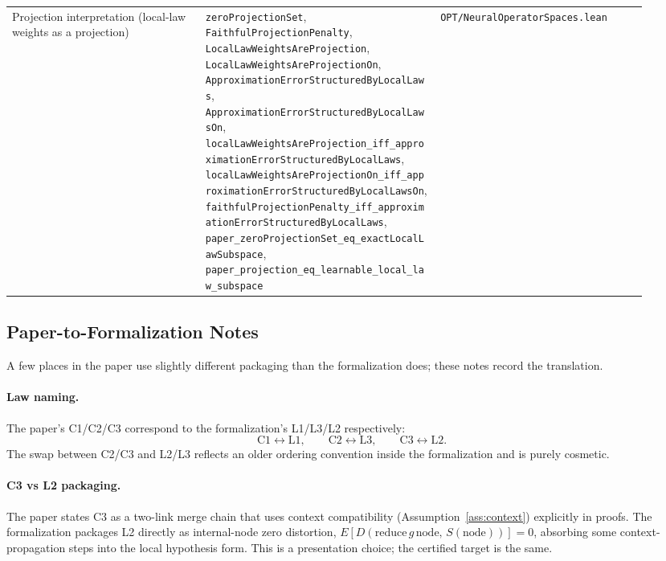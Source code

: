 {\begin{longtable}{p{0.28\linewidth}p{0.34\linewidth}p{0.30\linewidth}}
Projection interpretation (local-law weights as a projection) &
\texttt{zeroProjectionSet}, \texttt{FaithfulProjectionPenalty}, \texttt{LocalLawWeightsAreProjection}, \texttt{LocalLawWeightsAreProjectionOn}, \texttt{ApproximationErrorStructuredByLocalLaws}, \texttt{ApproximationErrorStructuredByLocalLawsOn}, \texttt{localLawWeightsAreProjection\_iff\_approximationErrorStructuredByLocalLaws}, \texttt{localLawWeightsAreProjectionOn\_iff\_approximationErrorStructuredByLocalLawsOn}, \texttt{faithfulProjectionPenalty\_iff\_approximationErrorStructuredByLocalLaws}, \texttt{paper\_zeroProjectionSet\_eq\_exactLocalLawSubspace}, \texttt{paper\_projection\_eq\_learnable\_local\_law\_subspace} &
\texttt{OPT/NeuralOperatorSpaces.lean} \\
\end{longtable}
}

\subsection{Paper-to-Formalization Notes}

A few places in the paper use slightly different packaging than the
formalization does; these notes record the translation.

\paragraph{Law naming.} The paper's C1/C2/C3 correspond to the
formalization's L1/L3/L2 respectively:
\[
\text{C1} \leftrightarrow \text{L1},\qquad
\text{C2} \leftrightarrow \text{L3},\qquad
\text{C3} \leftrightarrow \text{L2}.
\]
The swap between C2/C3 and L2/L3 reflects an older ordering convention
inside the formalization and is purely cosmetic.

\paragraph{C3 vs L2 packaging.} The paper states C3 as a two-link merge
chain that uses context compatibility
(Assumption~\ref{ass:context}) explicitly in proofs. The formalization
packages L2 directly as internal-node zero distortion,
$E[D(\mathrm{reduce}\,g\,\mathrm{node},\,S(\mathrm{node}))]=0$, absorbing
some context-propagation steps into the local hypothesis form. This is
a presentation choice; the certified target is the same.

